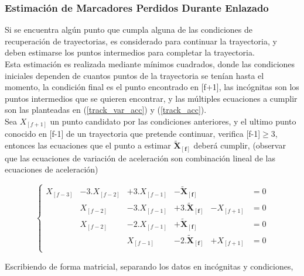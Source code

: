 \subsubsection{Estimación de Marcadores Perdidos Durante Enlazado}

Si se encuentra algún punto que cumpla alguna de las condiciones de recuperación de trayectorias, es considerado para continuar la trayectoria, y deben estimarse los puntos intermedios para completar la trayectoria.
\\ 

Esta estimación es realizada mediante mínimos cuadrados, donde las condiciones iniciales dependen de cuantos puntos de la trayectoria se tenían hasta el momento, la condición final es el punto encontrado en [f+1], las incógnitas son los puntos intermedios que se quieren encontrar, y las múltiples ecuaciones a cumplir son las planteadas en (\ref{track_var_acc}) y (\ref{track_acc}).
\\ 

Sea $X_{[f+1]}$ un punto candidato por las condiciones anteriores, y el ultimo punto conocido en [f-1] de un trayectoria que pretende continuar, verifica [f-1]$\geq$3, entonces las ecuaciones que el punto a estimar $\boldsymbol{\tilde{X}_{[f]}}$ deberá cumplir, (observar que las ecuaciones de variación de aceleración son combinación lineal de las ecuaciones de aceleración)

\begin{equation}
\left\{
\begin{matrix}
X_{[f-3]} &-3.X_{[f-2]} &+3.X_{[f-1]} &-\boldsymbol{\tilde{X}_{[f]}} & &=0 \\
 &X_{[f-2]} &-3.X_{[f-1]} &+3.\boldsymbol{\boldsymbol{\tilde{X}_{[f]}}} &-X_{[f+1]} &=0 \\
 &X_{[f-2]} &-2.X_{[f-1]} &+\boldsymbol{\boldsymbol{\tilde{X}_{[f]}}} & &=0 \\
 & &X_{[f-1]} &-2.\boldsymbol{\boldsymbol{\tilde{X}_{[f]}}} &+X_{[f+1]} &=0 \\
\end{matrix}
\right.
\label{ecuaciones_estimacion_01}
\end{equation}

Escribiendo de forma matricial, separando los datos en incógnitas y condiciones,

